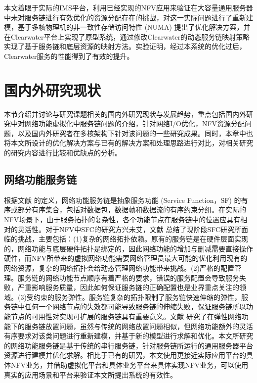 本文着眼于实际的IMS平台，利用已经实现的NFV应用来验证在大容量通用服务器中未对服务链进行有效优化的资源分配存在的挑战，对这一实际问题进行了重新建模，基于多核物理机的非一致性存储访问特性 (NUMA) 提出了优化解决方案，并在Clearwater平台上实现了原型系统，通过修改Clearwater的动态服务链映射策略实现了基于服务链和底层资源的映射方法。实验证明，经过本系统的优化过后，Clearwater服务的性能得到了有效的提升。


\section{国内外研究现状}
\label{intro:research}
本节介绍并讨论与研究课题相关的国内外研究现状与发展趋势，重点包括国内外研究中对网络功能虚拟化中服务链问题的介绍，针对网络I/O优化，NFV资源分配问题，以及国内外研究者在多核架构下针对该问题的一些研究成果。同时，本章中也将本文所设计的优化解决方案与已有的解决方案和处理思路进行对比，对相关研究的研究内容进行比较和优缺点的分析。

\subsection{网络功能服务链}
根据文献  的定义，网络功能服务链是抽象服务功能 (Service Function，SF) 的有序或部分有序集合，包括对数据包，数据帧和数据流的有序约束分组。在实际的NFV场景下，由于服务拓扑的复杂性，各个功能节点在服务链中的位置应具有相对的灵活性。对于NFV中SFC的研究方兴未艾，文献  总结了现阶段SFC研究所面临的挑战，主要包括：(1)复杂的网络拓扑依赖。原有的服务链是在硬件层面实现的，网络功能与底层硬件拓扑是绑定的，因此网络功能的增加与删减需要直接操作硬件，而NFV所带来的虚拟网络功能需要网络管理员最大可能的优化利用现有的网络资源，复杂的网络拓扑会给动态管理网络功能带来挑战。(2)严格的配置管理。服务链的网络功能节点顺序有着严格的要求，错误的服务配置会导致服务失败，严重影响服务质量，因此如何保证服务链的正确配置也是业界重点关注的领域。(3)受约束的服务弹性。服务链复杂的拓扑限制了服务链快速伸缩的弹性，服务链中任何一个网络节点的失效都可能导致服务链的伸缩失败，保证服务链所以功能节点的可用性对实现可扩展的服务链具有重要意义。文献  研究了在弹性网络功能下的服务链放置问题，虽然与传统的网络放置问题相似，但网络功能额外的灵活有序要求对该类问题进行重新建模，并基于新的模型进行求解和优化。本文所研究的网络功能服务链是基于传统的串行服务链，针对服务链所运行的通用服务器平台资源进行建模并优化求解。相比于已有的研究，本文使用更接近实际应用平台的具体NFV业务，并借助虚拟化平台和具体业务平台来具体实现NFV业务，可以使用真实的应用场景和平台来验证本文所提出系统的有效性。


